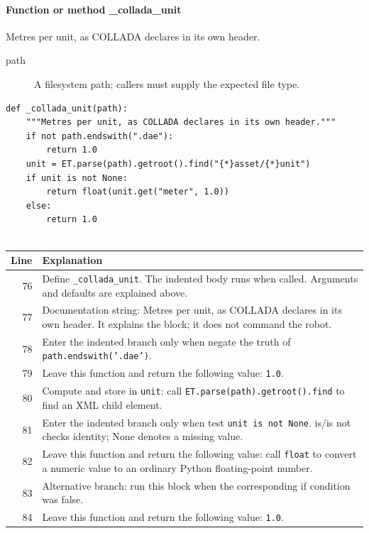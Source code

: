 \documentclass[11pt,a4paper]{book}
\begin{document}
\paragraph{Function or method \_collada\_unit}
Metres per unit, as COLLADA declares in its own header.

\begin{description}
\item[path] A filesystem path; callers must supply the expected file type.
\end{description}

\begin{lstlisting}[firstnumber=76]
def _collada_unit(path):
    """Metres per unit, as COLLADA declares in its own header."""
    if not path.endswith(".dae"):
        return 1.0
    unit = ET.parse(path).getroot().find("{*}asset/{*}unit")
    if unit is not None:
        return float(unit.get("meter", 1.0))
    else:
        return 1.0


\end{lstlisting}

\begin{longtable}{r p{}}

\textbf{Line} & \textbf{Explanation} \\ \hline \endhead

76 & Define \texttt{\_collada\_unit}. The indented body runs when called. Arguments and defaults are explained above. \\

77 & Documentation string: Metres per unit, as COLLADA declares in its own header. It explains the block; it does not command the robot. \\

78 & Enter the indented branch only when negate the truth of \texttt{path.endswith('.dae')}. \\

79 & Leave this function and return the following value: \texttt{1.0}. \\

80 & Compute and store in \texttt{unit}: call \texttt{ET.parse(path).getroot().find} to find an XML child element.  \\

81 & Enter the indented branch only when test \texttt{unit is not None}. is/is not checks identity; None denotes a missing value. \\

82 & Leave this function and return the following value: call \texttt{float} to convert a numeric value to an ordinary Python floating-point number. \\

83 & Alternative branch: run this block when the corresponding if condition was false. \\

84 & Leave this function and return the following value: \texttt{1.0}. \\

\end{longtable}
\end{document}
